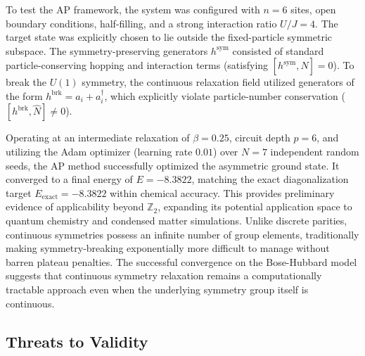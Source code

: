 \documentclass[10pt,twocolumn]{article}
\theoremstyle{remark}
\begin{document}
To test the AP framework, the system was configured with $n=6$ sites, open boundary conditions, half-filling, and a strong interaction ratio $U/J = 4$. The target state was explicitly chosen to lie outside the fixed-particle symmetric subspace. The symmetry-preserving generators $h^{\mathrm{sym}}$ consisted of standard particle-conserving hopping and interaction terms (satisfying $[h^{\mathrm{sym}}, \hat{N}] = 0$). To break the $U(1)$ symmetry, the continuous relaxation field utilized generators of the form $h^{\mathrm{brk}} = a_i + a_i^\dagger$, which explicitly violate particle-number conservation ($[h^{\mathrm{brk}}, \hat{N}] \neq 0$). 

Operating at an intermediate relaxation of $\beta=0.25$, circuit depth $p=6$, and utilizing the Adam optimizer (learning rate $0.01$) over $N=7$ independent random seeds, the AP method successfully optimized the asymmetric ground state. It converged to a final energy of $E = -8.3822$, matching the exact diagonalization target $E_{\text{exact}} = -8.3822$ within chemical accuracy. This provides preliminary evidence of applicability beyond $\mathbb{Z}_2$, expanding its potential application space to quantum chemistry and condensed matter simulations. Unlike discrete parities, continuous symmetries possess an infinite number of group elements, traditionally making symmetry-breaking exponentially more difficult to manage without barren plateau penalties. The successful convergence on the Bose-Hubbard model suggests that continuous symmetry relaxation remains a computationally tractable approach even when the underlying symmetry group itself is continuous.

\subsection{Threats to Validity}
\label{sec:threats}
\end{document}
